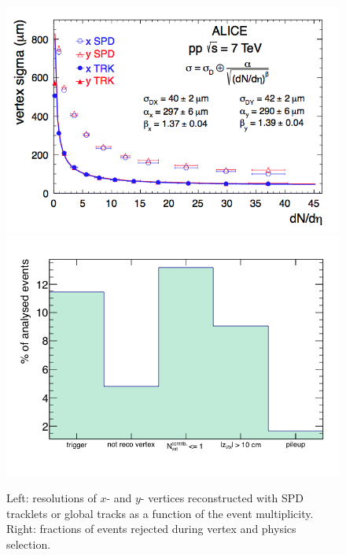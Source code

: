 \begin{figure}[!t]
\centering
\includegraphics[width=.49\textwidth]{FigCap4/VtxReso.png}
\includegraphics[width=.49\textwidth]{FigCap4/RejFracPass4.png}
\caption{Left: resolutions of $x$- and $y$- vertices reconstructed with SPD tracklets or global tracks as a function of the event multiplicity. Right: fractions of events rejected during vertex and physics selection.}
\label{fig:vxtReso}
\end{figure}



